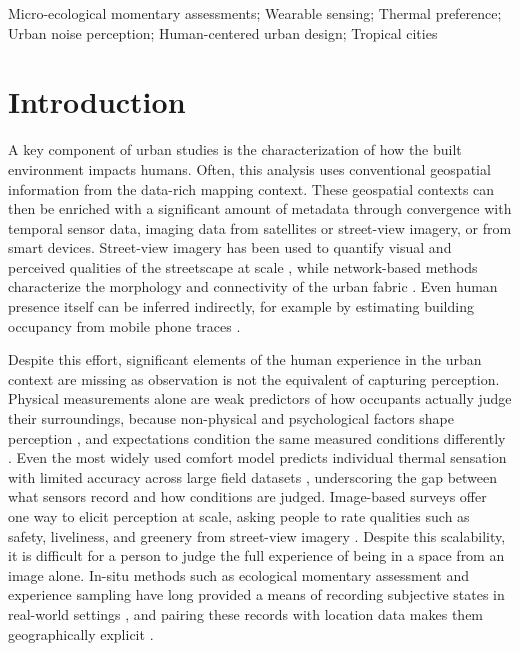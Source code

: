 \documentclass[]{interact}
\begin{document}
\begin{keywords}
Micro-ecological momentary assessments; Wearable sensing; Thermal preference; Urban noise perception; Human-centered urban design; Tropical cities
\end{keywords}

\section{Introduction}\label{sec:intro}

A key component of urban studies is the characterization of how the built environment impacts humans. 
Often, this analysis uses conventional geospatial information from the data-rich mapping context. 
These geospatial contexts can then be enriched with a significant amount of metadata through convergence with temporal sensor data, imaging data from satellites or street-view imagery, or from smart devices.
Street-view imagery has been used to quantify visual and perceived qualities of the streetscape at scale \citep{Ito2024-fs}, while network-based methods characterize the morphology and connectivity of the urban fabric \citep{Yap2023-xs}.
Even human presence itself can be inferred indirectly, for example by estimating building occupancy from mobile phone traces \citep{Barbour2019-py}.

Despite this effort, significant elements of the human experience in the urban context are missing as observation is not the equivalent of capturing perception.
Physical measurements alone are weak predictors of how occupants actually judge their surroundings, because non-physical and psychological factors shape perception \citep{Castaldo2018-ih}, and expectations condition the same measured conditions differently \citep{Schweiker2020-pw}.
Even the most widely used comfort model predicts individual thermal sensation with limited accuracy across large field datasets \citep{Cheung2019-fs}, underscoring the gap between what sensors record and how conditions are judged.
Image-based surveys offer one way to elicit perception at scale, asking people to rate qualities such as safety, liveliness, and greenery from street-view imagery \citep{Ito2024-fs,Gu2025-fp,Quintana2025-tn}.
Despite this scalability, it is difficult for a person to judge the full experience of being in a space from an image alone.
In-situ methods such as ecological momentary assessment and experience sampling have long provided a means of recording subjective states in real-world settings \citep{Stone1994-he,Christensen2003-zn}, and pairing these records with location data makes them geographically explicit \citep{Kirchner2016-dq}.
\end{document}
